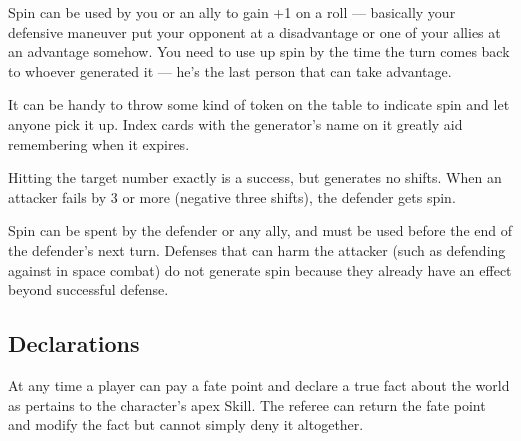 Spin can be used by you or an ally to gain +1 on a roll --- basically your defensive maneuver put your opponent at a disadvantage or one of your allies at an advantage somehow. You need to use up spin by the time the turn comes back to whoever generated it --- he's the last person that can take advantage.

It can be handy to throw some kind of token on the table to indicate spin and let anyone pick it up. Index cards with the generator's name on it greatly aid remembering when it expires.

Hitting the target number exactly is a success, but generates no shifts. When an attacker fails by 3 or more (negative three shifts), the defender gets spin.

Spin can be spent by the defender or any ally, and must be used before the end of the defender's next turn. Defenses that can harm the attacker (such as defending against  in space combat) do not generate spin because they already have an effect beyond successful defense.

\subsection{Declarations}
\label{sec:declarations}

At any time a player can pay a fate point and declare a true fact about the world as pertains to the character's apex Skill. The referee can return the fate point and modify the fact but cannot simply deny it altogether.

